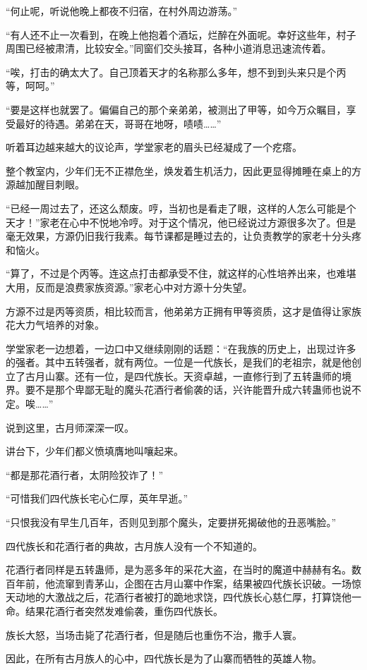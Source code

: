 \begin{this_body}
“何止呢，听说他晚上都夜不归宿，在村外周边游荡。”

“有人还不止一次看到，在晚上他抱着个酒坛，烂醉在外面呢。幸好这些年，村子周围已经被肃清，比较安全。”同窗们交头接耳，各种小道消息迅速流传着。

“唉，打击的确太大了。自己顶着天才的名称那么多年，想不到到头来只是个丙等，呵呵。”

“要是这样也就罢了。偏偏自己的那个亲弟弟，被测出了甲等，如今万众瞩目，享受最好的待遇。弟弟在天，哥哥在地呀，啧啧……”

听着耳边越来越大的议论声，学堂家老的眉头已经凝成了一个疙瘩。

整个教室内，少年们无不正襟危坐，焕发着生机活力，因此更显得摊睡在桌上的方源越加醒目刺眼。

“已经一周过去了，还这么颓废。哼，当初也是看走了眼，这样的人怎么可能是个天才！”家老在心中不悦地冷哼。对于这个情况，他已经说过方源很多次了。但是毫无效果，方源仍旧我行我素。每节课都是睡过去的，让负责教学的家老十分头疼和恼火。

“算了，不过是个丙等。连这点打击都承受不住，就这样的心性培养出来，也难堪大用，反而是浪费家族资源。”家老心中对方源十分失望。

方源不过是丙等资质，相比较而言，他弟弟方正拥有甲等资质，这才是值得让家族花大力气培养的对象。

学堂家老一边想着，一边口中又继续刚刚的话题：“在我族的历史上，出现过许多的强者。其中五转强者，就有两位。一位是一代族长，是我们的老祖宗，就是他创立了古月山寨。还有一位，是四代族长。天资卓越，一直修行到了五转蛊师的境界。要不是那个卑鄙无耻的魔头花酒行者偷袭的话，兴许能晋升成六转蛊师也说不定。唉……”

说到这里，古月师深深一叹。

讲台下，少年们都义愤填膺地叫嚷起来。

“都是那花酒行者，太阴险狡诈了！”

“可惜我们四代族长宅心仁厚，英年早逝。”

“只恨我没有早生几百年，否则见到那个魔头，定要拼死揭破他的丑恶嘴脸。”

四代族长和花酒行者的典故，古月族人没有一个不知道的。

花酒行者同样是五转蛊师，是为恶多年的采花大盗，在当时的魔道中赫赫有名。数百年前，他流窜到青茅山，企图在古月山寨中作案，结果被四代族长识破。一场惊天动地的大激战之后，花酒行者被打的跪地求饶，四代族长心慈仁厚，打算饶他一命。结果花酒行者突然发难偷袭，重伤四代族长。

族长大怒，当场击毙了花酒行者，但是随后也重伤不治，撒手人寰。

因此，在所有古月族人的心中，四代族长是为了山寨而牺牲的英雄人物。


\end{this_body}
